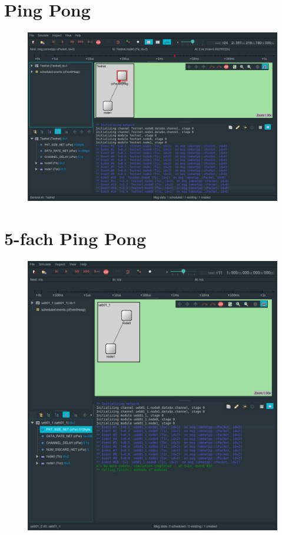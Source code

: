 \documentclass[]{scrartcl}
\begin{document}
\section{Ping Pong}
\begin{figure}[ht]
    \centering
    \includegraphics[width=\columnwidth]{ueb01-1.png}
\end{figure}

\section{5-fach Ping Pong}
\begin{figure}[ht]
    \centering
    \includegraphics[width=\columnwidth]{ueb01-2.png}
\end{figure}
\end{document}
